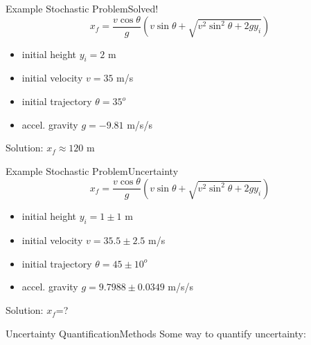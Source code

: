 \documentclass{beamer}
\begin{document}
\begin{frame}{Example Stochastic Problem}{Solved!}\vspace{-50pt}
\begin{equation*}
x_f=\frac{v\cos{\theta}}{g}\left(v\sin\theta+\sqrt{v^2\sin^2\theta + 2gy_i}\right)
\end{equation*}
\begin{itemize}
\item initial height $y_i = 2$ m
\item initial velocity $v = 35$ m/s
\item initial trajectory $\theta = 35^o$
\item accel. gravity $g = -9.81$ m/s/s
\end{itemize}
Solution: $x_f\approx120$ m
\end{frame}

\begin{frame}{Example Stochastic Problem}{Uncertainty}\vspace{-50pt}
\begin{equation*}
x_f=\frac{v\cos{\theta}}{g}\left(v\sin\theta+\sqrt{v^2\sin^2\theta + 2gy_i}\right)
\end{equation*}
\begin{itemize}
\item initial height $y_i = 1\pm1$ m
\item initial velocity $v = 35.5\pm2.5$ m/s
\item initial trajectory $\theta = 45\pm10^o$
\item accel. gravity $g = 9.7988 \pm0.0349$ m/s/s
\end{itemize}
Solution: $x_f$=?
\end{frame}

\begin{frame}{Uncertainty Quantification}{Methods}\vspace{-20pt}
Some way to quantify uncertainty:
\end{frame}
\end{document}
